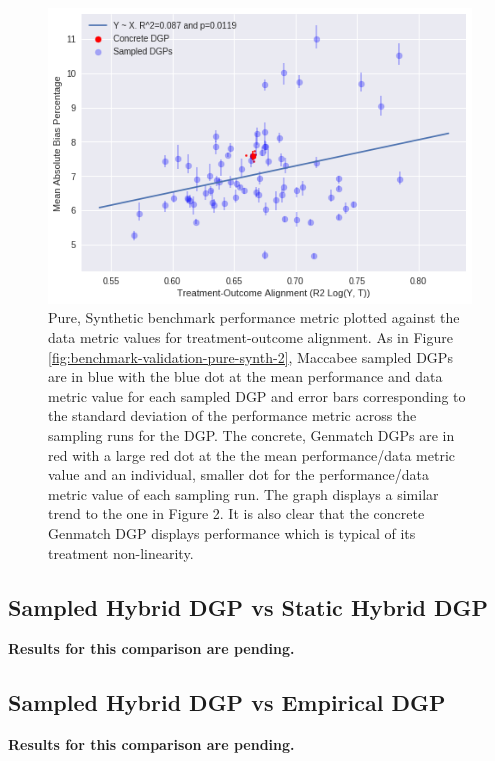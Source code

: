 \documentclass[../main.tex]{subfiles}
\begin{document}
\begin{figure}[ht!]
    \centering
    \includegraphics[width=1\linewidth]{figures/ch7-benchmark-pure-synth-3.png}
    \caption{Pure, Synthetic benchmark performance metric plotted against the data metric values for treatment-outcome alignment. As in Figure \ref{fig:benchmark-validation-pure-synth-2}, Maccabee sampled DGPs are in blue with the blue dot at the mean performance and data metric value for each sampled DGP and error bars corresponding to the standard deviation of the performance metric across the sampling runs for the DGP. The concrete, Genmatch DGPs are in red with a large red dot at the the mean performance/data metric value and an individual, smaller dot for the performance/data metric value of each sampling run. The graph displays a similar trend to the one in Figure 2.  It is also clear that the concrete Genmatch DGP displays performance which is typical of its treatment non-linearity.}
    \label{fig:benchmark-validation-pure-synth-3}
\end{figure}
\FloatBarrier

\subsection{Sampled Hybrid DGP vs Static Hybrid DGP}

\textbf{Results for this comparison are pending.}

\subsection{Sampled Hybrid DGP vs Empirical DGP}

\textbf{Results for this comparison are pending.}
\end{document}
